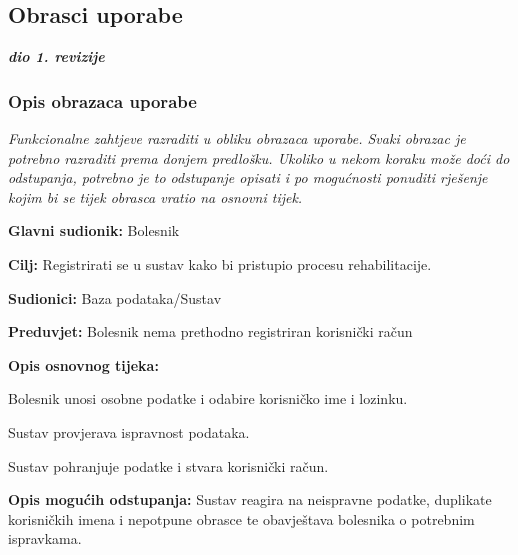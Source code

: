 \documentclass{article}
\begin{document}
\eject

\subsection{Obrasci uporabe}

\textbf{\textit{dio 1. revizije}}

\subsubsection{Opis obrazaca uporabe}
\textit{Funkcionalne zahtjeve razraditi u obliku obrazaca uporabe. Svaki obrazac je potrebno razraditi prema donjem predlošku. Ukoliko u nekom koraku može doći do odstupanja, potrebno je to odstupanje opisati i po mogućnosti ponuditi rješenje kojim bi se tijek obrasca vratio na osnovni tijek.}
\vspace{2em} %

\noindent {}
\begin{packed_item}
\item \textbf{Glavni sudionik:} Bolesnik
\item \textbf{Cilj:} Registrirati se u sustav kako bi pristupio procesu rehabilitacije.
\item \textbf{Sudionici:} Baza podataka/Sustav
\item \textbf{Preduvjet:} Bolesnik nema prethodno registriran korisnički račun
\item \textbf{Opis osnovnog tijeka:}
\begin{packed_enum}
\item Bolesnik unosi osobne podatke i odabire korisničko ime i lozinku.
\item Sustav provjerava ispravnost podataka.
\item Sustav pohranjuje podatke i stvara korisnički račun.
\end{packed_enum}
\item \textbf{Opis mogućih odstupanja:}
Sustav reagira na neispravne podatke, duplikate korisničkih imena i nepotpune obrasce te obavještava bolesnika o potrebnim ispravkama.
\end{packed_item}
\vspace{1em} %
\end{document}
